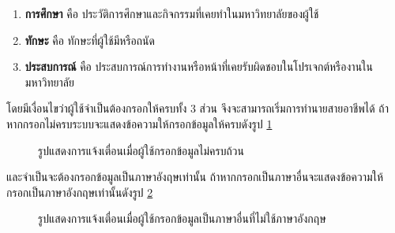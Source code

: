 \begin{enumerate}
    \item \textbf{การศึกษา} คือ ประวัติการศึกษาและกิจกรรมที่เคยทำในมหาวิทยาลัยของผู้ใช้
    \item \textbf{ทักษะ} คือ ทักษะที่ผู้ใช้มีหรือถนัด
    \item \textbf{ประสบการณ์} คือ ประสบการณ์การทำงานหรือหน้าที่เคยรับผิดชอบในโปรเจกต์หรืองานในมหาวิทยาลัย
\end{enumerate}

โดยมีเงื่อนไขว่าผู้ใช้จำเป็นต้องกรอกให้ครบทั้ง 3 ส่วน จึงจะสามารถเริ่มการทำนายสายอาชีพได้ ถ้าหากกรอกไม่ครบระบบจะแสดงข้อความให้กรอกข้อมูลให้ครบดังรูป \ref{fig:warning-CP}
\begin{figure}[H]\centering
    \caption{รูปแสดงการแจ้งเตื่อนเมื่อผู้ใช้กรอกข้อมูลไม่ครบถ้วน}\label{fig:warning-CP}
\end{figure}
และจำเป็นจะต้องกรอกข้อมูลเป็นภาษาอังฤษเท่านั้น ถ้าหากกรอกเป็นภาษาอื่นจะแสดงข้อความให้กรอกเป็นภาษาอังกฤษเท่านั้นดังรูป \ref{fig:warningTH-CP}
\begin{figure}[H]\centering
    \caption{รูปแสดงการแจ้งเตื่อนเมื่อผู้ใช้กรอกข้อมูลเป็นภาษาอื่นที่ไม่ใช้ภาษาอังกฤษ}\label{fig:warningTH-CP}
\end{figure}
